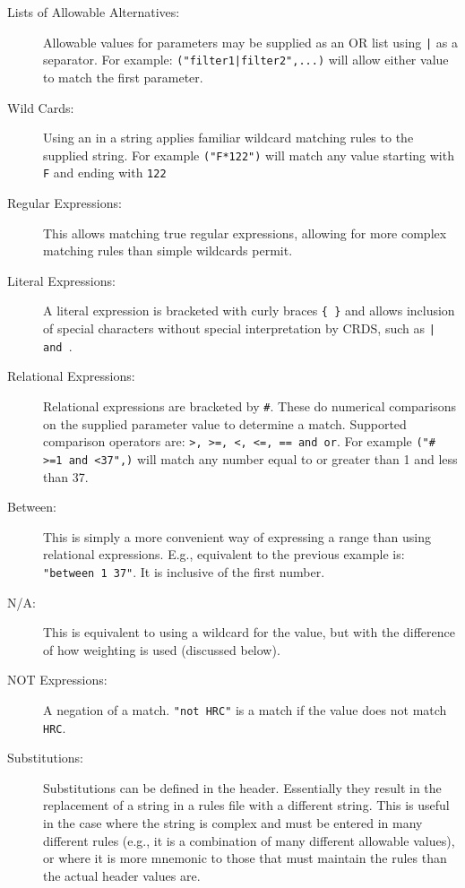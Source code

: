 \documentclass[final,authoryear,5p,times,twocolumn]{elsarticle}
\begin{document}
\begin{description}
\item[Lists of Allowable Alternatives:] Allowable values for parameters
may be supplied as an \textquotesingle OR\textquotesingle
{\tt }list using {\tt |} as a separator. For example:
\texttt {({\ttfamily"}filter1|filter2{\ttfamily"},...)} will allow either value to match the first
parameter.
\item[Wild Cards:] Using an {\tt *} in a string applies familiar wildcard 
matching rules to the supplied string. For example 
\texttt {({\ttfamily"}F*122{\ttfamily"})} will
match any value starting with {\tt F} and ending with {\tt 122}
\item[Regular Expressions:] This allows matching true regular expressions,
allowing for more complex matching rules than simple wildcards permit.
\item[Literal Expressions:] A literal expression is bracketed with curly
braces {\tt \{ \}} and allows inclusion of special characters without 
special interpretation by CRDS, such as {\tt | and \*}.
\item[Relational Expressions:] Relational expressions are bracketed by {\tt \#}.
These do numerical comparisons on the supplied parameter value to determine
a match. Supported comparison operators are: 
\texttt {\textgreater, \textgreater =, \textless, \textless =, == and or}. 
For example \texttt {({\ttfamily"}\# >=1 and <37",)} 
will match any number equal to or 
greater than 1 and less than 37.
\item[Between:] This is simply a more convenient way of expressing a range
than using relational expressions. E.g., equivalent to the previous example
is: \texttt{{\ttfamily"}between 1 37{\ttfamily"}}. It is inclusive of the first number.
\item[N/A:] This is equivalent to using a wildcard for the value, but with 
the difference of how weighting is used (discussed below). 
\item[NOT Expressions:] A negation of a match. 
\texttt {{\ttfamily"}not HRC{\ttfamily"}} 
is a match if the value does not match {\tt HRC}.
\item[Substitutions:] Substitutions can be defined in the header. Essentially
they result in the replacement of a string in a rules file with a different
string. This is useful in the case where the string is complex and must be 
entered in many different rules (e.g., it is a combination of many different 
allowable values), or where it is more mnemonic to those that must maintain
the rules than the actual header values are.
\end{description}
\end{document}
